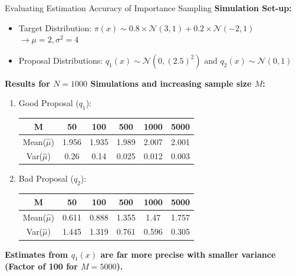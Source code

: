 \documentclass[10pt]{beamer}
\begin{document}
\begin{frame}{Evaluating Estimation Accuracy of Importance Sampling}
\textbf{Simulation Set-up:}
\begin{itemize}
    \item Target Distribution: $\pi(x) \sim 0.8 \times \mathcal{N}(3, 1) + 0.2 \times \mathcal{N}(-2, 1)$ $\longrightarrow \mu=2, \sigma^2 = 4$
    \item Proposal Distributions: $q_1(x) \sim \mathcal{N}(0, (2.5)^2)$ and $q_2(x) \sim \mathcal{N}(0, 1)$
\end{itemize}
\textbf{Results for $N=1000$ Simulations and increasing sample size $M$:}
\begin{enumerate}
    \item Good Proposal ($q_1$):
    \begin{table}
        \centering
        \begin{tabular}{cccccc}
             \textbf{M} & \textbf{50} & \textbf{100} & \textbf{500} & \textbf{1000} & \textbf{5000} \\ \hline \hline
           Mean($\hat{\mu}$) & 1.956 & 1.935 & 1.989 & 2.007 & 2.001\\ 
           Var($\hat{\mu}$) & 0.26 & 0.14 & 0.025 & 0.012 & 0.003 \\ \hline
        \end{tabular}
        \label{tab:my_label1}
    \end{table}
    \item Bad Proposal ($q_2$):
            \begin{table}[]
        \centering
        \begin{tabular}{cccccc}
            \textbf{M} & \textbf{50} & \textbf{100} & \textbf{500} & \textbf{1000} & \textbf{5000} \\ \hline \hline
           Mean($\hat{\mu}$) & 0.611 & 0.888 & 1.355 & 1.47 & 1.757 \\
           Var($\hat{\mu}$) & 1.445 & 1.319 & 0.761 & 0.596 & 0.305 \\ \hline
        \end{tabular}
        \label{tab:my_label1}
    \end{table}
\end{enumerate}
\begin{center}
  \textbf{Estimates from $q_1(x)$ are far more precise with smaller variance (Factor of 100 for $M=5000$).}
\end{center}

\end{frame}
\end{document}
